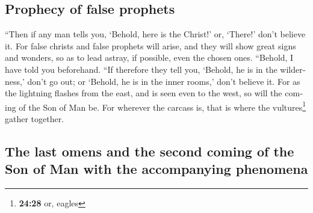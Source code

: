 \begin{paracol}{2}
\begin{otherlanguage}{english}
\hypertarget{prophecy-of-false-prophets}{%
\subsection{Prophecy of false
prophets}\label{prophecy-of-false-prophets}}

 ``Then if any man tells you, `Behold, here is the
Christ!' or, `There!' don't believe it.  For false
christs and false prophets will arise, and they will show great signs
and wonders, so as to lead astray, if possible, even the chosen ones.
 ``Behold, I have told you beforehand. 
``If therefore they tell you, `Behold, he is in the wilderness,' don't
go out; or `Behold, he is in the inner rooms,' don't believe it.
 For as the lightning flashes from the east, and is seen
even to the west, so will the coming of the Son of Man be.
 For wherever the carcass is, that is where the
vultures\footnote{\textbf{24:28} or, eagles} gather together.

\hypertarget{the-last-omens-and-the-second-coming-of-the-son-of-man-with-the-accompanying-phenomena}{%
\subsection{The last omens and the second coming of the Son of Man with
the accompanying
phenomena}\label{the-last-omens-and-the-second-coming-of-the-son-of-man-with-the-accompanying-phenomena}}


\end{otherlanguage}
\end{paracol}
